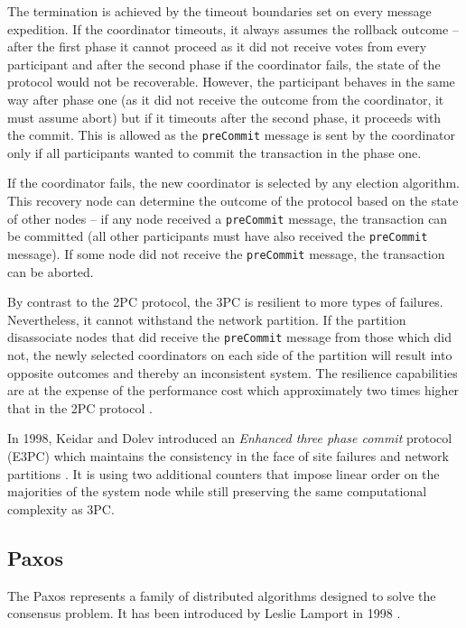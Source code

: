 \documentclass[oneside,
  digital, %
  table,   %
  nolof,     %
  nolot,     %
]{fithesis3}
\begin{document}
The termination is achieved by the timeout boundaries set on every message expedition. If the coordinator timeouts, it always assumes the rollback outcome -- after the first phase it cannot proceed as it did not receive votes from every participant and after the second phase if the coordinator fails, the state of the protocol would not be recoverable. However, the participant behaves in the same way after phase one (as it did not receive the outcome from the coordinator, it must assume abort) but if it timeouts after the second phase, it proceeds with the commit. This is allowed as the \texttt{preCommit} message is sent by the coordinator only if all participants wanted to commit the transaction in the phase one.

If the coordinator fails, the new coordinator is selected by any election algorithm. This recovery node can determine the outcome of the protocol based on the state of other nodes -- if any node received a \texttt{preCommit} message, the transaction can be committed (all other participants must have also received the \texttt{preCommit} message). If some node did not receive the \texttt{preCommit} message, the transaction can be aborted.

By contrast to the 2PC protocol, the 3PC is resilient to more types of failures. Nevertheless, it cannot withstand the network partition. If the partition disassociate nodes that did receive the \texttt{preCommit} message from those which did not, the newly selected coordinators on each side of the partition will result into opposite outcomes and thereby an inconsistent system. The resilience capabilities are at the expense of the performance cost which approximately two times higher that in the 2PC protocol \cite{3PC}.

In 1998, Keidar and Dolev introduced an \textit{Enhanced three phase commit} protocol (E3PC) which maintains the consistency in the face of site failures and network partitions \cite{E3PC}. It is using two additional counters that impose linear order on the majorities of the system node while still preserving the same computational complexity as 3PC. 


\subsection{Paxos}

The Paxos represents a family of distributed algorithms designed to solve the consensus problem. It has been introduced by Leslie Lamport in 1998 \cite{Paxos}.
\end{document}
